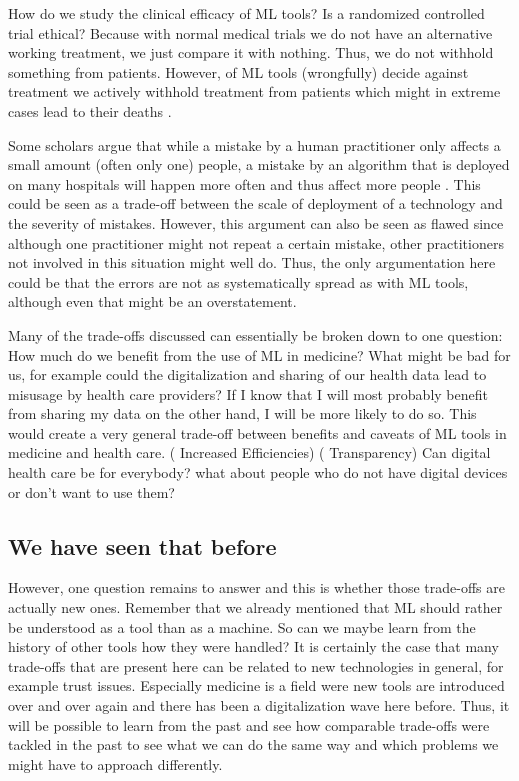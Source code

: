 How do we study the clinical efficacy of ML tools? Is a randomized controlled trial ethical? Because with normal medical trials we do not have an alternative working treatment, we just compare it with nothing. Thus, we do not withhold something from patients. However, of ML tools (wrongfully) decide against treatment we actively withhold treatment from patients which might in extreme cases lead to their deaths \cite{genin2021randomized}.

Some scholars argue that while a mistake by a human practitioner only affects a small amount (often only one) people, a mistake by an algorithm that is deployed on many hospitals will happen more often and thus affect more people \cite{Morley2020}. This could be seen as a trade-off between the scale of deployment of a technology and the severity of mistakes. However, this argument can also be seen as flawed since although one practitioner might not repeat a certain mistake, other practitioners not involved in this situation might well do. Thus, the only argumentation here could be that the errors are not as systematically spread as with ML tools, although even that might be an overstatement.

 Many of the trade-offs discussed can essentially be broken down to one question: How much do we benefit from the use of ML in medicine? What might be bad for us, for example could the digitalization and sharing of our health data lead to misusage by health care providers? If I know that I will most probably benefit from sharing my data on the other hand, I will be more likely to do so. This would create a very general trade-off between benefits and caveats of ML tools in medicine and health care. (\cite{topol2019high} Increased Efficiencies) (\cite{he2019practical} Transparency)
Can digital health care be for everybody? what about people who do not have digital devices or don't want to use them?


\subsection{We have seen that before}


However, one question remains to answer and this is whether those trade-offs are actually new ones. Remember that we already mentioned that ML should rather be understood as a tool than as a machine. So can we maybe learn from the history of other tools how they were handled? It is certainly the case that many trade-offs that are present here can be related to new technologies in general, for example trust issues. Especially medicine is a field were new tools are introduced over and over again and there has been a digitalization wave here before. Thus, it will be possible to learn from the past and see how comparable trade-offs were tackled in the past to see what we can do the same way and which problems we might have to approach differently. 


